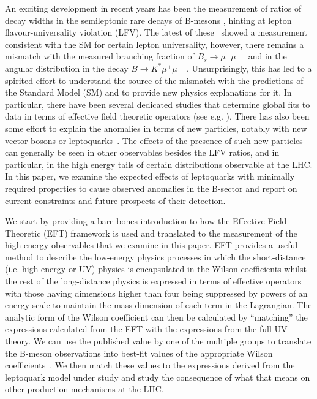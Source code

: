 \documentclass[12pt]{revtex4-2}
\numberwithin{equation}{section}
\begin{document}
An exciting development in recent years has been the measurement of   ratios of decay widths in the semileptonic rare decays of B-mesons \cite{LHCb:2022qnv,LHCb:2022zom, ATLAS:2018cur, CMS:2019bbr}, hinting at lepton flavour-universality violation (LFV).  The latest of these~\cite{LHCb:2022qnv,LHCb:2022zom} showed a measurement consistent with the SM for certain lepton universality, however, there remains a mismatch with the measured branching fraction of $B_s \rightarrow \mu^+ \mu^-$~\cite{ATLAS:2018cur, CMS:2019bbr}  and in the angular distribution in the decay $B \rightarrow K^* \mu^+ \mu^-$~\cite{LHCb:2020gog, Gubernari:2022hxn}.  Unsurprisingly, this has led to a spirited effort to understand the source of the mismatch with the predictions of the Standard Model (SM) and to provide new physics explanations for it.  In particular, there have been several dedicated studies that determine global fits to data in terms of effective field theoretic  operators (see e.g. \cite{Ciuchini:2022wbq, Ciuchini:2019usw, Alguero:2019ptt, Alok:2019ufo, Hurth:2021nsi}).  There has also been some effort to explain the anomalies in terms of new particles, notably with new vector bosons  or leptoquarks~\cite{Angelescu:2018tyl, Becirevic:2016oho, Descotes-Genon:2015uva, Cornella:2019hct}.  The effects of the presence of such new particles can generally be seen in other observables besides the LFV ratios, and in particular, in the high energy tails of certain distributions observable at the LHC.   In this paper, we examine the expected effects of leptoquarks with minimally required properties to cause observed anomalies in the B-sector and report on current constraints and future prospects of their detection.

We start by providing a bare-bones introduction to how the Effective Field Theoretic (EFT) framework is used and translated to the measurement of the high-energy observables that we examine in this paper. EFT provides a useful method to describe the low-energy physics processes in which the short-distance (i.e. high-energy or UV) physics is encapsulated in the Wilson coefficients whilst the rest of the long-distance physics is expressed in terms of effective operators with those having  dimensions higher than four being suppressed by powers of an energy scale to maintain the mass dimension of each term in the Lagrangian.  The analytic form of the Wilson coefficient can then be calculated by ``matching'' the expressions calculated from the EFT with the expressions from the full UV theory.  We can use the published value by one of the multiple groups to translate the B-meson observations into best-fit values of the appropriate Wilson coefficients~\cite{Ciuchini:2022wbq, Ciuchini:2019usw, 
 Aebischer:2019mlg, Alguero:2019ptt, Alok:2019ufo, Hurth:2021nsi}.  We then match these values to the expressions derived from the leptoquark model under study and study the consequence of what that means on other production mechanisms at the LHC.
\end{document}
